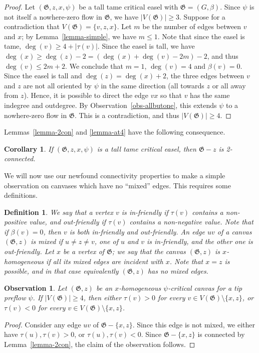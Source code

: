 \documentclass{article}
\newcommand\g{\mathfrak{G}}
\newtheorem{observation}[theorem]{Observation}
\newtheorem{corollary}[theorem]{Corollary}
\newtheorem{definition}[theorem]{Definition}
\begin{document}
\begin{proof}
Let $(\g,z,x,\psi)$ be a tall tame critical easel with $\g=(G,\beta)$.  Since $\psi$ is not itself a nowhere-zero flow in $\g$,
we have $|V(\g)|\ge 3$.  Suppose for a contradiction that $V(\g)=\{v,z,x\}$.  Let $m$ be the number of edges between $v$ and $x$;
by Lemma~\ref{lemma-simple}, we have $m\le 1$.  Note that since the easel is tame, $\deg(v)\ge 4+|\tau(v)|$.  Since the easel is tall, we have
$\deg(x)\ge \deg(z)-2=(\deg(x)+\deg(v)-2m)-2$, and thus $\deg(v)\le 2m+2$.  We conclude that $m=1$, $\deg(v)=4$ and $\beta(v)=0$.
Since the easel is tall and $\deg(z)=\deg(x)+2$, the three edges between $v$ and $z$
are not all oriented by $\psi$ in the same direction (all towards $z$ or all away from $z$).
Hence, it is possible to direct the edge $vx$ so that $v$ has the same indegree and outdegree.
By Observation~\ref{obs-allbutone}, this extends $\psi$ to a nowhere-zero flow in $\g$.
This is a contradiction, and thus $|V(\g)|\ge 4$.
\end{proof}

Lemmas~\ref{lemma-2con} and \ref{lemma-at4} have the following consequence.

\begin{corollary}\label{cor-2con}
If $(\g,z,x,\psi)$ is a tall tame critical easel, then $\g-z$ is 2-connected.
\end{corollary}

We will now use our newfound connectivity properties to make a simple observation on canvases which have no ``mixed'' edges. This requires some definitions.
\begin{definition}
\label{def:xhom}
We say that a vertex $v$ is \emph{in-friendly} if $\tau(v)$ contains a non-positive value, and \emph{out-friendly} if $\tau(v)$ contains a non-negative value.  Note that if $\beta(v)=0$, then $v$ is both in-friendly and out-friendly.
An edge $uv$ of a canvas $(\g, z)$ is \emph{mixed} if $u\neq z\neq v$, one of $u$ and $v$ is in-friendly, and the other one is out-friendly.
Let $x$ be a vertex of $\g$; we say that the canvas $(\g,z)$ is \emph{$x$-homogeneous} if all its mixed edges are incident with $x$.
Note that $x=z$ is possible, and in that case equivalently $(\g,z)$ has no mixed edges.
\end{definition}

\begin{observation}\label{obs-allplusminus}
Let $(\g,z)$ be an $x$-homogeneous $\psi$-critical canvas for a tip preflow $\psi$.
If $|V(\g)|\ge 4$, then either $\tau(v)>0$ for every $v\in V(\g)\setminus\{x,z\}$, or $\tau(v)<0$ for every $v\in V(\g)\setminus\{x,z\}$.
\end{observation}
\begin{proof}
Consider any edge $uv$ of $\g-\{x,z\}$.  Since this edge is not mixed, we either have $\tau(u),\tau(v)>0$, or $\tau(u),\tau(v)<0$.
Since $\g-\{x,z\}$ is connected by Lemma~\ref{lemma-2con}, the claim of the observation follows.
\end{proof}
\end{document}
